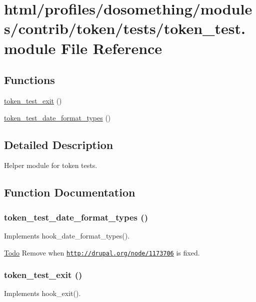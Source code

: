 \hypertarget{token__test_8module}{
\section{html/profiles/dosomething/modules/contrib/token/tests/token\_\-test.module File Reference}
\label{token__test_8module}
}
\subsection*{Functions}
\begin{DoxyCompactItemize}
\item 
\hyperlink{token__test_8module_a7f4bb649dcba805af1772ab18eea505d}{token\_\-test\_\-exit} ()
\item 
\hyperlink{token__test_8module_ae5274fe6510bcb89e53bd7e66c7deb43}{token\_\-test\_\-date\_\-format\_\-types} ()
\end{DoxyCompactItemize}


\subsection{Detailed Description}
Helper module for token tests. 

\subsection{Function Documentation}
\hypertarget{token__test_8module_ae5274fe6510bcb89e53bd7e66c7deb43}{
\subsubsection[{token\_\-test\_\-date\_\-format\_\-types}]{\setlength{\rightskip}{0pt plus 5cm}token\_\-test\_\-date\_\-format\_\-types ()}}
\label{token__test_8module_ae5274fe6510bcb89e53bd7e66c7deb43}
Implements hook\_\-date\_\-format\_\-types().

\begin{Desc}
\item[\hyperlink{todo__todo000043}{Todo}]Remove when \href{http://drupal.org/node/1173706}{\tt http://drupal.org/node/1173706} is fixed. \end{Desc}
\hypertarget{token__test_8module_a7f4bb649dcba805af1772ab18eea505d}{
\subsubsection[{token\_\-test\_\-exit}]{\setlength{\rightskip}{0pt plus 5cm}token\_\-test\_\-exit ()}}
\label{token__test_8module_a7f4bb649dcba805af1772ab18eea505d}
Implements hook\_\-exit(). 
